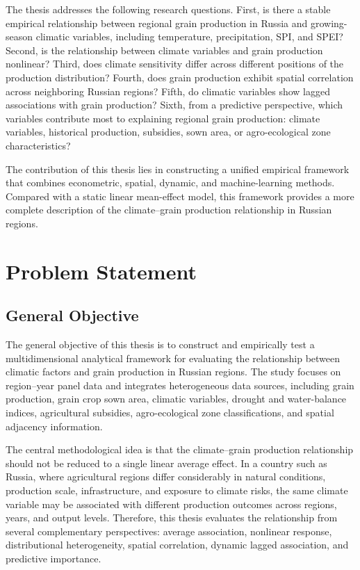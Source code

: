 \documentclass[12pt,a4paper]{article}
\begin{document}
The thesis addresses the following research questions. First, is there a stable empirical relationship between regional grain production in Russia and growing-season climatic variables, including temperature, precipitation, SPI, and SPEI? Second, is the relationship between climate variables and grain production nonlinear? Third, does climate sensitivity differ across different positions of the production distribution? Fourth, does grain production exhibit spatial correlation across neighboring Russian regions? Fifth, do climatic variables show lagged associations with grain production? Sixth, from a predictive perspective, which variables contribute most to explaining regional grain production: climate variables, historical production, subsidies, sown area, or agro-ecological zone characteristics?

The contribution of this thesis lies in constructing a unified empirical framework that combines econometric, spatial, dynamic, and machine-learning methods. Compared with a static linear mean-effect model, this framework provides a more complete description of the climate--grain production relationship in Russian regions.

\section{Problem Statement}

\subsection{General Objective}

The general objective of this thesis is to construct and empirically test a multidimensional analytical framework for evaluating the relationship between climatic factors and grain production in Russian regions. The study focuses on region--year panel data and integrates heterogeneous data sources, including grain production, grain crop sown area, climatic variables, drought and water-balance indices, agricultural subsidies, agro-ecological zone classifications, and spatial adjacency information.

The central methodological idea is that the climate--grain production relationship should not be reduced to a single linear average effect. In a country such as Russia, where agricultural regions differ considerably in natural conditions, production scale, infrastructure, and exposure to climate risks, the same climate variable may be associated with different production outcomes across regions, years, and output levels. Therefore, this thesis evaluates the relationship from several complementary perspectives: average association, nonlinear response, distributional heterogeneity, spatial correlation, dynamic lagged association, and predictive importance.
\end{document}
